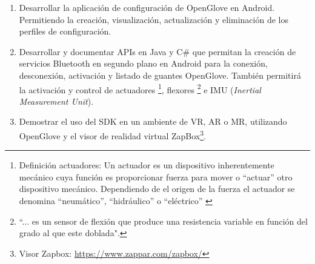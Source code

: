 \begin{enumerate}
\item Desarrollar la aplicación de configuración de OpenGlove en Android. Permitiendo la creación, visualización, actualización y eliminación de los perfiles de configuración.

\item Desarrollar y documentar APIs en Java y C\# que permitan la creación de servicios Bluetooth en segundo plano en Android para la conexión, desconexión, activación y listado de guantes OpenGlove.  También permitirá la activación y control de actuadores \footnote{Definición actuadores: Un actuador es un dispositivo inherentemente mecánico cuya función es proporcionar fuerza para mover o “actuar” otro dispositivo mecánico. Dependiendo de el origen de la fuerza el actuador se denomina ``neumático'', ``hidráulico'' o ``eléctrico'' \citep{actuadores}}, flexores \footnote{  ``... es un sensor de flexión que produce una resistencia variable en función del grado al que este doblada".\citep{flexor-sensor-01}} e IMU (\textit{Inertial Measurement Unit}).


\item Demostrar el uso del SDK en un ambiente de VR, AR o MR, utilizando OpenGlove y el visor de realidad virtual ZapBox\footnote{Visor Zapbox: \url{https://www.zappar.com/zapbox/}}.
\end{enumerate}


